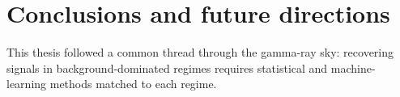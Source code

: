 \section*{Conclusions and future directions}
This thesis followed a common thread through the gamma-ray sky: recovering signals in background-dominated regimes requires statistical and machine-learning methods matched to each regime. 
%
